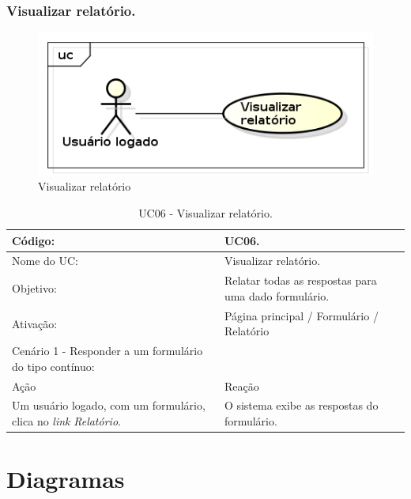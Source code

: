 \documentclass[11pt]{article}
\begin{document}
    \clearpage
      
      \subsubsection{Visualizar relatório.}

        \begin{figure}[h!]
          \centering
          \includegraphics[width=.5\textwidth]{visualizar.png}
          \caption{Visualizar relatório}
        \end{figure}

        \begin{table}[h]
          \begin{center}
            \begin{tabular}{ | p{7cm} | p{8cm} | }
              \hline
              Código: \cellcolor{gray} & UC06. \\
              \hline
              Nome do UC: \cellcolor{gray} & Visualizar relatório. \\
              \hline
              Objetivo: \cellcolor{gray} & Relatar todas as respostas para uma dado formulário. \\
              \hline
              Ativação: \cellcolor{gray} & Página principal / Formulário / Relatório \\
              \hline
              \hline
              Cenário 1 - Responder a um formulário do tipo contínuo: &  \\
              \hline
              Ação\cellcolor{gray} & Reação\cellcolor{gray} \\
              \hline
              Um usuário logado, com um formulário, clica no {\em link} {\em Relatório}. & O sistema exibe as respostas do formulário. \\
              \hline
            \end{tabular}
            \caption{UC06 - Visualizar relatório.}
          \end{center}
        \end{table}
        
  \clearpage
      
  \section{Diagramas}
  
\end{document}

